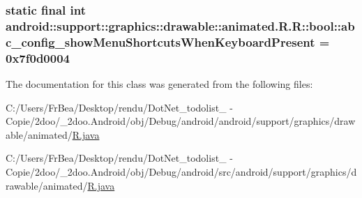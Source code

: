 \hypertarget{classandroid_1_1support_1_1graphics_1_1drawable_1_1animated_1_1_r_1_1bool_e7a6726e461c916bb0430d57cff5effb}{
\subsubsection[{abc\_\-config\_\-showMenuShortcutsWhenKeyboardPresent}]{\setlength{\rightskip}{0pt plus 5cm}static final int android::support::graphics::drawable::animated.R.R::bool::abc\_\-config\_\-showMenuShortcutsWhenKeyboardPresent = 0x7f0d0004}}
\label{classandroid_1_1support_1_1graphics_1_1drawable_1_1animated_1_1_r_1_1bool_e7a6726e461c916bb0430d57cff5effb}




The documentation for this class was generated from the following files:\begin{CompactItemize}
\item 
C:/Users/FrBea/Desktop/rendu/DotNet\_\-todolist\_ - Copie/2doo/\_\-2doo.Android/obj/Debug/android/android/support/graphics/drawable/animated/\hyperlink{android_2support_2graphics_2drawable_2animated_2_r_8java}{R.java}\item 
C:/Users/FrBea/Desktop/rendu/DotNet\_\-todolist\_ - Copie/2doo/\_\-2doo.Android/obj/Debug/android/src/android/support/graphics/drawable/animated/\hyperlink{src_2android_2support_2graphics_2drawable_2animated_2_r_8java}{R.java}\end{CompactItemize}
